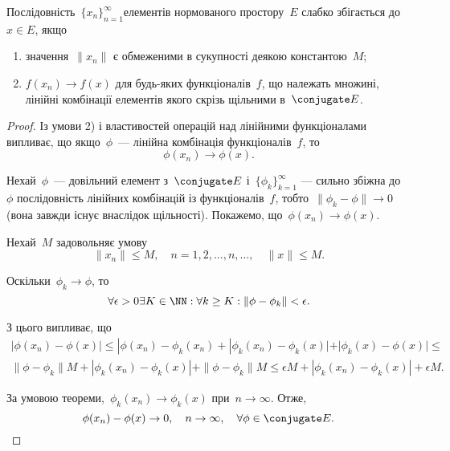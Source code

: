 \begin{theorem}
Послідовність~$\{x_n\}_{n = 1}^\infty$елементів
нормованого простору~$E$ слабко збігається до~$x \in E$, якщо
\begin{enumerate}
\item значення~$\|x_n\|$ є обмеженими в сукупності деякою
константою~$M$;
\item $f(x_n) \to f(x)$ для будь-яких функціоналів~$f$, що
належать множині, лінійні комбінації елементів якого скрізь
щільними в~$\conjugate E$.
\end{enumerate}
\end{theorem}

\begin{proof}
Із умови 2) і властивостей операцій над
лінійними функціоналами випливає, що якщо~$\phi$~--- лінійна
комбінація функціоналів~$f$, то
\begin{equation*}
    \phi(x_n) \to \phi(x).
\end{equation*}

Нехай~$\phi$~--- довільний елемент з~$\conjugate E$ і~$\{\phi_k\}_{k = 1}^\infty$
--- сильно збіжна до~$\phi$ послідовність лінійних комбінацій із
функціоналів~$f$, тобто~$\|\phi_k - \phi\| \to 0$ (вона завжди існує
внаслідок щільності). Покажемо, що~$\phi(x_n) \to \phi(x)$.

Нехай~$M$ задовольняє умову
\begin{equation*}
    \|x_n\| \le M, \quad n = 1, 2, \dots, n, \dots, \quad \|x\| \le M.
\end{equation*}

Оскільки~$\phi_k \to \phi$, то
\begin{equation*}
    \forall \epsilon > 0 \exists K \in \NN:
    \forall k \ge K: \|\phi - \phi_k\| < \epsilon.
\end{equation*}

З цього випливає, що
\begin{multline*}
    |\phi(x_n) - \phi(x)| \le
    |\phi(x_n) - \phi_k(x_n) +
    |\phi_k(x_n) - \phi_k(x)| +
    |\phi_k(x) - \phi(x)| \le \\
    \|\phi - \phi_k\| M +
    |\phi_k(x_n) - \phi_k(x)| +
    \|\phi - \phi_k\| M \le 
    \epsilon M + 
    |\phi_k(x_n) - \phi_k(x)| +
    \epsilon M.
\end{multline*}

За умовою теореми,~$\phi_k(x_n) \to \phi_k(x)$ при~$n \to \infty$. Отже,
\begin{equation*}
    \phi(x_n) - \phi(x) \to 0, \quad n \to \infty, \quad \forall \phi \in \conjugate E. \qedhere
\end{equation*}
\end{proof}

